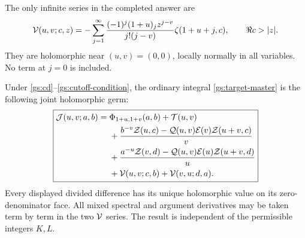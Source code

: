 The only infinite series in the completed answer are
\begin{equation}\label{gs:V}
 \mathcal V(u,v;c,z)=
 -\sum_{j=1}^\infty
 \frac{(-1)^j(1+u)_j z^{j-v}}{j!(j-v)}
                    \zeta(1+u+j,c),\qquad \Re c>|z|.
\end{equation}
They are holomorphic near $(u,v)=(0,0)$, locally normally in all
variables.  No term at $j=0$ is included.

\begin{theorem}
\label{gs:completed}
Under \eqref{gs:cd}--\eqref{gs:cutoff-condition}, the ordinary integral
\eqref{gs:target-master} is the following joint holomorphic germ:
\begin{align}
 \boxed{\begin{aligned}
 \mathcal J(u,v;a,b)={}&\Phi_{1+u,1+v}(a,b)+\mathcal T(u,v)\\
 &+\frac{b^{-v}\mathcal Z(u,c)
       -\mathcal Q(u,v)\mathcal E(v)\mathcal Z(u+v,c)}{v}\\
 &+\frac{a^{-u}\mathcal Z(v,d)
       -\mathcal Q(u,v)\mathcal E(u)\mathcal Z(u+v,d)}{u}\\
 &+\mathcal V(u,v;c,b)+\mathcal V(v,u;d,a).
 \end{aligned}}
 \label{gs:completed-formula}
\end{align}
Every displayed divided difference has its unique holomorphic value
on its zero-denominator face.  All mixed spectral and argument
derivatives may be taken term by term in the two $\mathcal V$ series.
The result is independent of the permissible integers $K,L$.
\end{theorem}

